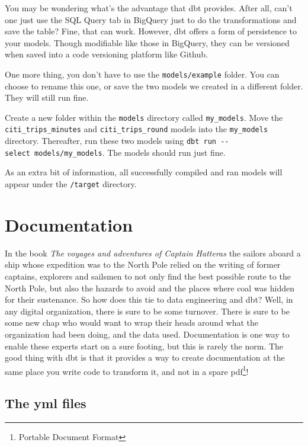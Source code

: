 \documentclass[
]{book}
\begin{document}
You may be wondering what's the advantage that dbt provides. After all, can't one just use the SQL Query tab in BigQuery just to do the transformations and save the table? Fine, that can work. However, dbt offers a form of persistence to your models. Though modifiable like those in BigQuery, they can be versioned when saved into a code versioning platform like Github.

One more thing, you don't have to use the \texttt{models/example} folder. You can choose to rename this one, or save the two models we created in a different folder. They will still run fine.

Create a new folder within the \texttt{models} directory called \texttt{my\_models}. Move the \texttt{citi\_trips\_minutes} and \texttt{citi\_trips\_round} models into the \texttt{my\_models} directory. Thereafter, run these two models using \texttt{dbt\ run\ -\/-select\ models/my\_models}. The models should run just fine.

As an extra bit of information, all successfully compiled and ran models will appear under the \texttt{/target} directory.

\hypertarget{documentation-1}{%
\chapter{Documentation}\label{documentation-1}}

In the book \emph{The voyages and adventures of Captain Hatteras} the sailors aboard a ship whose expedition was to the North Pole relied on the writing of former captains, explorers and sailsmen to not only find the best possible route to the North Pole, but also the hazards to avoid and the places where coal was hidden for their sustenance. So how does this tie to data engineering and dbt? Well, in any digital organization, there is sure to be some turnover. There is sure to be some new chap who would want to wrap their heads around what the organization had been doing, and the data used. Documentation is one way to enable these experts start on a sure footing, but this is rarely the norm. The good thing with dbt is that it provides a way to create documentation at the same place you write code to transform it, and not in a spare pdf\footnote{Portable Document Format}!

\hypertarget{the-yml-files}{%
\section{The yml files}\label{the-yml-files}}
\end{document}
